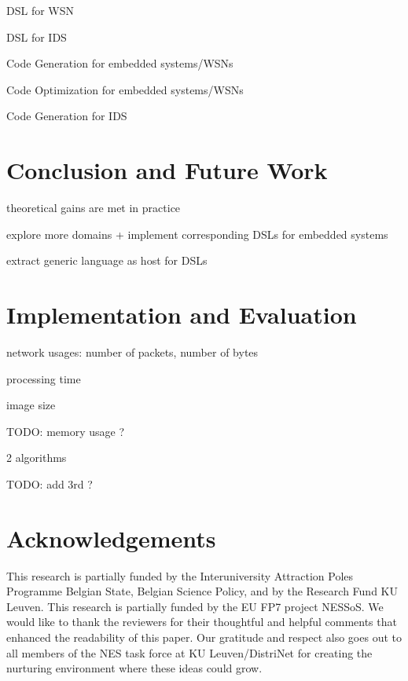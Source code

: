 \documentclass[conference]{IEEEtran}
\begin{document}
DSL for WSN \cite{naumowicz2009prototyping,levis2004tinyscript}

DSL for IDS \cite{eckmann2002statl}

Code Generation for embedded systems/WSNs \cite{leupers2000code,marwedel2002code}

Code Optimization for embedded systems/WSNs \cite{panda2001data,naik2001software}

Code Generation for IDS \cite{charitakis2003code}

\section{Conclusion and Future Work}
\label{conclusion}

theoretical gains are met in practice

explore more domains + implement corresponding DSLs for embedded systems

extract generic language as host for DSLs

\section{Implementation and Evaluation}

network usages: number of packets, number of bytes

processing time

image size

TODO: memory usage ?

2 algorithms \cite{ganeriwal2008reputation}

TODO: add 3rd ? \cite{krontiris2009cooperative}


\section*{Acknowledgements}

This research is partially funded by the Interuniversity Attraction Poles
Programme Belgian State, Belgian Science Policy, and by the Research Fund KU
Leuven. This research is partially funded by the EU FP7 project NESSoS. We
would like to thank the reviewers for their thoughtful and helpful comments
that enhanced the readability of this paper. Our gratitude and respect also
goes out to all members of the NES task force at KU Leuven/DistriNet for
creating the nurturing environment where these ideas could grow.



\end{document}
